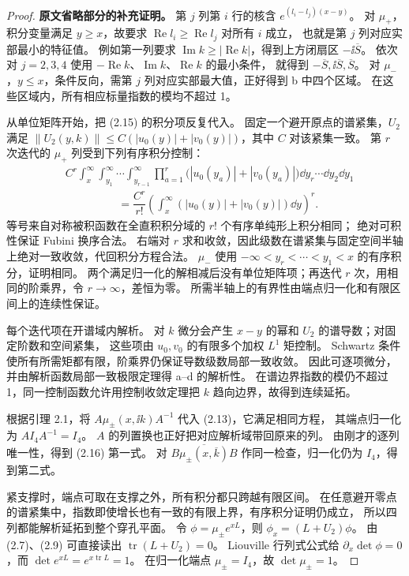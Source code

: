 \begin{proof}
\textbf{原文省略部分的补充证明。}
第 $j$ 列第 $i$ 行的核含 $e^{(l_i-l_j)(x-y)}$。
对 $\mu_+$，积分变量满足 $y\ge x$，故要求 $\operatorname{Re}l_i\ge\operatorname{Re}l_j$ 对所有 $i$ 成立，
也就是第 $j$ 列对应实部最小的特征值。
例如第一列要求 $\operatorname{Im}k\ge|\operatorname{Re}k|$，得到上方闭扇区 $-\ii\overline S$。
依次对 $j=2,3,4$ 使用 $-\operatorname{Re}k$、$\operatorname{Im}k$、$\operatorname{Re}k$ 的最小条件，
就得到 $-\overline S,\ii\overline S,\overline S$。
对 $\mu_-$，$y\le x$，条件反向，需第 $j$ 列对应实部最大值，正好得到 b 中四个区域。
在这些区域内，所有相应标量指数的模均不超过 1。

从单位矩阵开始，把 (2.15) 的积分项反复代入。
固定一个避开原点的谱紧集，$U_2$ 满足
$\|U_2(y,k)\|\le C(|u_0(y)|+|v_0(y)|)$，其中 $C$ 对该紧集一致。
第 $r$ 次迭代的 $\mu_+$ 列受到下列有序积分控制：
\begin{align*}
&C^r\int_x^\infty\int_{y_1}^\infty\cdots\int_{y_{r-1}}^\infty
\prod\limits_{a=1}^r\bigl(|u_0(y_a)|+|v_0(y_a)|\bigr)
\dd y_r\cdots\dd y_2\dd y_1\\
&\hspace{2cm}=\dfrac{C^r}{r!}
\left(\int_x^\infty(|u_0(y)|+|v_0(y)|)\dd y\right)^r.
\end{align*}
等号来自对称被积函数在全直积积分域的 $r!$ 个有序单纯形上积分相同；
绝对可积性保证 Fubini 换序合法。
右端对 $r$ 求和收敛，因此级数在谱紧集与固定空间半轴上绝对一致收敛，代回积分方程合法。
$\mu_-$ 使用 $-\infty<y_r<\cdots<y_1<x$ 的有序积分，证明相同。
两个满足归一化的解相减后没有单位矩阵项；再迭代 $r$ 次，用相同的阶乘界，令 $r\to\infty$，差恒为零。
所需半轴上的有界性由端点归一化和有限区间上的连续性保证。

每个迭代项在开谱域内解析。
对 $k$ 微分会产生 $x-y$ 的幂和 $U_2$ 的谱导数；对固定阶数和空间紧集，
这些项由 $u_0,v_0$ 的有限多个加权 $L^1$ 矩控制。
Schwartz 条件使所有所需矩都有限，阶乘界仍保证导数级数局部一致收敛。
因此可逐项微分，并由解析函数局部一致极限定理得 a--d 的解析性。
在谱边界指数的模仍不超过 1，同一控制函数允许用控制收敛定理把 $k$ 趋向边界，故得到连续延拓。

根据引理 2.1，将 $A\mu_\pm(x,\ii k)A^{-1}$ 代入 (2.13)，它满足相同方程，
其端点归一化为 $AI_4A^{-1}=I_4$。
$A$ 的列置换也正好把对应解析域带回原来的列。
由刚才的逐列唯一性，得到 (2.16) 第一式。
对 $B\overline{\mu_\pm(x,\overline k)}B$ 作同一检查，归一化仍为 $I_4$，得到第二式。

紧支撑时，端点可取在支撑之外，所有积分都只跨越有限区间。
在任意避开零点的谱紧集中，指数即使增长也有一致的有限上界，有序积分证明仍成立，
所以四列都能解析延拓到整个穿孔平面。
令 $\phi=\mu_\pm e^{xL}$，则 $\phi_x=(L+U_2)\phi$。
由 (2.7)、(2.9) 可直接读出 $\operatorname{tr}(L+U_2)=0$。
Liouville 行列式公式给 $\partial_x\det\phi=0$，而 $\det e^{xL}=e^{x\operatorname{tr}L}=1$。
在归一化端点 $\mu_\pm=I_4$，故 $\det\mu_\pm=1$。
\end{proof}

